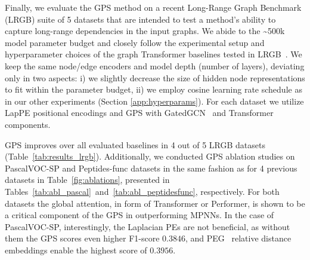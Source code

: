 \documentclass{article}
\begin{document}


Finally, we evaluate the GPS method on a recent Long-Range Graph Benchmark (LRGB) suite of 5 datasets that are intended to test a method's ability to capture long-range dependencies in the input graphs. We abide to the \textasciitilde500k model parameter budget and closely follow the experimental setup and hyperparameter choices of the graph Transformer baselines tested in LRGB~\cite{dwivedi2022LRGB}. We keep the same node/edge encoders and model depth (number of layers), deviating only in two aspects: i) we slightly decrease the size of hidden node representations to fit within the parameter budget, ii) we employ cosine learning rate schedule as in our other experiments (Section \ref{app:hyperparams}). For each dataset we utilize LapPE positional encodings and GPS with GatedGCN~\cite{bresson2017GatedGCN} and Transformer~\cite{vaswani2017attention} components.

GPS improves over all evaluated baselines in 4 out of 5 LRGB datasets (Table~\ref{tab:results_lrgb}). Additionally, we conducted GPS ablation studies on PascalVOC-SP and Peptides-func datasets in the same fashion as for 4 previous datasets in Table~\ref{fig:ablations}, presented in Tables~\ref{tab:abl_pascal}~and~\ref{tab:abl_peptidesfunc}, respectively. For both datasets the global attention, in form of Transformer or Performer, is shown to be a critical component of the GPS in outperforming MPNNs. In the case of PascalVOC-SP, interestingly, the Laplacian PEs are not beneficial, as without them the GPS scores even higher F1-score $0.3846$, and PEG~\cite{wang2022equivstable} relative distance embeddings enable the highest score of $0.3956$.
\end{document}

